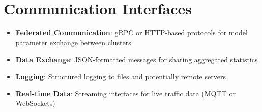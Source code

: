 \section{Communication Interfaces}

\begin{itemize}
\item \textbf{Federated Communication}: gRPC or HTTP-based protocols for model parameter exchange between clusters
\item \textbf{Data Exchange}: JSON-formatted messages for sharing aggregated statistics
\item \textbf{Logging}: Structured logging to files and potentially remote servers
\item \textbf{Real-time Data}: Streaming interfaces for live traffic data (MQTT or WebSockets)
\end{itemize}